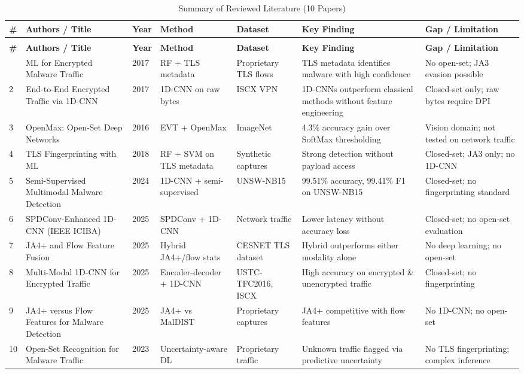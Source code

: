 \documentclass[12pt,a4paper]{report}
\begin{document}
\clearpage
\begin{longtable}{|>{\scriptsize}p{0.3cm}|
                  >{\scriptsize}p{2.8cm}|
                  >{\scriptsize}p{0.85cm}|
                  >{\scriptsize}p{1.7cm}|
                  >{\scriptsize}p{2.0cm}|
                  >{\scriptsize}p{2.0cm}|
                  >{\scriptsize}p{1.7cm}|}
\caption{Summary of Reviewed Literature (10 Papers)} \label{tab:litreview} \\
\hline
\textbf{\#} & \textbf{Authors / Title} & \textbf{Year} & \textbf{Method} &
\textbf{Dataset} & \textbf{Key Finding} & \textbf{Gap / Limitation} \\
\hline
\endfirsthead
\multicolumn{7}{c}{\tablename\ \thetable{} \textit{(continued)}} \\
\hline
\textbf{\#} & \textbf{Authors / Title} & \textbf{Year} & \textbf{Method} &
\textbf{Dataset} & \textbf{Key Finding} & \textbf{Gap / Limitation} \\
\hline
\endhead
\hline
\multicolumn{7}{r}{\scriptsize\textit{Continued on next page\ldots}}
\endfoot
\hline
\endlastfoot
1 & ML for Encrypted Malware Traffic & 2017 & RF + TLS metadata &
Proprietary TLS flows & TLS metadata identifies malware with high confidence &
No open-set; JA3 evasion possible \\[2pt]
2 & End-to-End Encrypted Traffic via 1D-CNN & 2017 & 1D-CNN on raw bytes &
ISCX VPN & 1D-CNNs outperform classical methods without feature engineering &
Closed-set only; raw bytes require DPI \\[2pt]
3 & OpenMax: Open-Set Deep Networks & 2016 & EVT + OpenMax &
ImageNet & 4.3\% accuracy gain over SoftMax thresholding &
Vision domain; not tested on network traffic \\[2pt]
4 & TLS Fingerprinting with ML & 2018 & RF + SVM on TLS metadata &
Synthetic captures & Strong detection without payload access &
Closed-set; JA3 only; no 1D-CNN \\[2pt]
5 & Semi-Supervised Multimodal Malware Detection & 2024 & 1D-CNN + semi-supervised &
UNSW-NB15 & 99.51\% accuracy, 99.41\% F1 on UNSW-NB15 &
Closed-set; no fingerprinting standard \\[2pt]
6 & SPDConv-Enhanced 1D-CNN (IEEE ICIBA) & 2025 & SPDConv + 1D-CNN &
Network traffic & Lower latency without accuracy loss &
Closed-set; no open-set evaluation \\[2pt]
7 & JA4+ and Flow Feature Fusion & 2025 & Hybrid JA4+/flow stats &
CESNET TLS dataset & Hybrid outperforms either modality alone &
No deep learning; no open-set \\[2pt]
8 & Multi-Modal 1D-CNN for Encrypted Traffic & 2025 & Encoder-decoder + 1D-CNN &
USTC-TFC2016, ISCX & High accuracy on encrypted \& unencrypted traffic &
Closed-set; no fingerprinting \\[2pt]
9 & JA4+ versus Flow Features for Malware Detection & 2025 & JA4+ vs MalDIST &
Proprietary captures & JA4+ competitive with flow features &
No 1D-CNN; no open-set \\[2pt]
10 & Open-Set Recognition for Malware Traffic & 2023 & Uncertainty-aware DL &
Proprietary traffic & Unknown traffic flagged via predictive uncertainty &
No TLS fingerprinting; complex inference \\[2pt]


\end{longtable}
\end{document}
